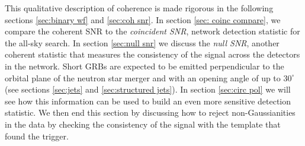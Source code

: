 \documentclass[11pt]{cuthesis}
\begin{document}
This qualitative description of coherence is made rigorous in the following sections \ref{sec:binary wf} and \ref{sec:coh snr}. In section \ref{sec: coinc compare}, we compare the coherent SNR to the \textit{coincident SNR}, network detection statistic for the all-sky search. In section \ref{sec:null snr} we discuss the \textit{null SNR}, another coherent statistic that measures the consistency of the signal across the detectors in the network. Short GRBs are expected to be emitted perpendicular to the orbital plane of the neutron star merger and with an opening angle of up to $30^\circ$ (see sections \ref{sec:jets} and \ref{sec:structured jets}). In section \ref{sec:circ pol} we will see how this information can be used to build an even more sensitive detection statistic. We then end this section by discussing how to reject non-Gaussianities in the data by checking the consistency of the signal with the template that found the trigger.
\end{document}
